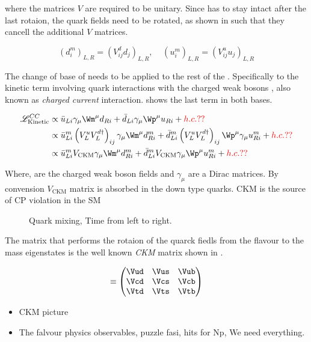 \noindent where the matrices $V$ are required to be unitary. Since  has to stay intact after the last
rotaion, the quark fields need to be rotated, as shown in  such that they cancell the additional $V$ matrices.

\begin{equation}
  \left( d_{i}^m \right)_{L,R} = \left( V^d_{ij} d_{j} \right)_{L,R}, \;\;\;\; \left( u_{i}^m \right)_{L,R} = \left( V^u_{ij} u_{j} \right)_{L,R}
  \label{quark_rotation}
\end{equation}

The change of base of  needs to be applied to the rest of the . Specifically
to the kinetic term involving quark interactions with the charged weak bosons \Wpm, also known as {\it charged current}
interaction.  shows the last term in both bases.

\begin{align}
  \mathscr{L}_{\text{Kinetic}}^{CC} &\propto \bar{u}_{Li} \gamma_\mu {\Wm}^\mu d_{Ri} + \bar{d}_{Li} \gamma_\mu {\Wp}^\mu u_{Ri} + {\color{red} h.c.??}  \\
                               &\propto \bar{u}_{Li}^m \left( V^u_LV^{d\dagger}_L\right)_{ij} \gamma_\mu {\Wm}^\mu d_{Ri}^m + \bar{d}_{Li}^m \left( V^u_LV^{d\dagger}_L\right)_{ij} {\Wp}^\mu \gamma_\mu u_{Ri}^m + {\color{red} h.c.??} \nonumber \\
                               &\propto \bar{u}_{Li}^m V_{\text{CKM}} \gamma_\mu {\Wm}^\mu d_{Ri}^m + \bar{d}_{Li}^m V_{\text{CKM}} \gamma_\mu {\Wp}^\mu u_{Ri}^m + {\color{red} h.c.??}
   \label{CClagrangian}
\end{align}

\noindent Where, \Wpm are the charged weak boson fields and $\gamma_\mu$ are a Dirac matrices.
By convension $V_\text{CKM}$ matrix is absorbed in the down type quarks. CKM is the source of CP violation in the SM

\begin{figure}[h]
  {\sffamily }
  \caption{Quark mixing, Time from left to right.}
  \label{QuarkMixing}
\end{figure}



\noindent The matrix that performs the rotaion of the quarck fiedls from the flavour to the mass eigenstates is the
well known {\it CKM} matrix shown in \equref{}.


\begin{equation}
      \equiv \begin{pmatrix} \Vud & \Vus & \Vub \\ \Vcd & \Vcs & \Vcb \\ \Vtd & \Vts & \Vtb \end{pmatrix}
  \end{equation}




\begin{itemize}
  \item CKM picture
  \item The falvour physics observables, puzzle fasi, hits for Np, We need everything.
\end{itemize}
